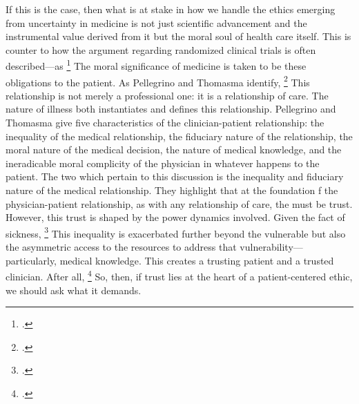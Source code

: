 \documentclass[letterpaper,notitlepage,12pt]{article}
\begin{document}
If this is the case, then what is at stake in how we handle the ethics emerging
from uncertainty in medicine is not just scientific advancement and the
instrumental value derived from it but the moral soul of health care itself.
This is counter to how the argument regarding randomized clinical trials is
often described---as \footcite[p. 4]{schafer_commentary_1985}
The moral significance of medicine is taken to be these obligations to the
patient.
As Pellegrino and Thomasma identify, \footcite[p. 40]{pellegrino_virtues_1993}
This relationship is not merely a professional one: it is a relationship of
care.
The nature of illness both instantiates and defines this relationship.
Pellegrino and Thomasma give five characteristics of the clinician-patient
relationship: the inequality of the medical relationship, the fiduciary nature 
of the relationship, the moral nature of the medical decision, the nature of 
medical knowledge, and the ineradicable moral complicity of the physician in
whatever happens to the patient.
The two which pertain to this discussion is the inequality and fiduciary
nature of the medical relationship.
They highlight that at the foundation f the physician-patient relationship, as
with any relationship of care, the must be trust.
However, this trust is shaped by the power dynamics involved.
Given the fact of sickness, \footcite[p.
42]{pellegrino_virtues_1993}
This inequality is exacerbated further beyond the vulnerable but also the
asymmetric access to the resources to address that vulnerability---particularly,
medical knowledge.
This creates a trusting patient and a trusted clinician.
After all, \footcite[p. 68]{pellegrino_virtues_1993}
So, then, if trust lies at the heart of a patient-centered ethic, we should ask
what it demands.
\end{document}

